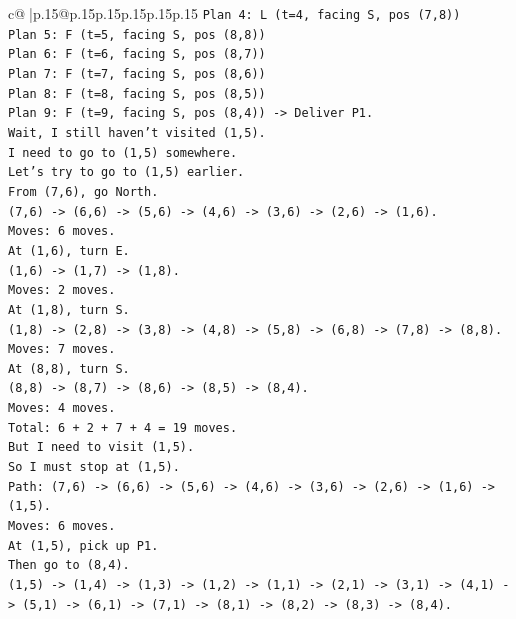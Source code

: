 \documentclass{article}
\begin{document}
{\begin{supertabular}{c@{$\;$}|p{.15\linewidth}@{}p{.15\linewidth}p{.15\linewidth}p{.15\linewidth}p{.15\linewidth}p{.15\linewidth}}
{{{\texttt{Plan 4: L (t=4, facing S, pos (7,8))} \\
\texttt{Plan 5: F (t=5, facing S, pos (8,8))} \\
\texttt{Plan 6: F (t=6, facing S, pos (8,7))} \\
\texttt{Plan 7: F (t=7, facing S, pos (8,6))} \\
\texttt{Plan 8: F (t=8, facing S, pos (8,5))} \\
\texttt{Plan 9: F (t=9, facing S, pos (8,4)) {-}> Deliver P1.} \\
\texttt{Wait, I still haven't visited (1,5).} \\
\texttt{I need to go to (1,5) somewhere.} \\
\texttt{Let's try to go to (1,5) earlier.} \\
\texttt{From (7,6), go North.} \\
\texttt{(7,6) {-}> (6,6) {-}> (5,6) {-}> (4,6) {-}> (3,6) {-}> (2,6) {-}> (1,6).} \\
\texttt{Moves: 6 moves.} \\
\texttt{At (1,6), turn E.} \\
\texttt{(1,6) {-}> (1,7) {-}> (1,8).} \\
\texttt{Moves: 2 moves.} \\
\texttt{At (1,8), turn S.} \\
\texttt{(1,8) {-}> (2,8) {-}> (3,8) {-}> (4,8) {-}> (5,8) {-}> (6,8) {-}> (7,8) {-}> (8,8).} \\
\texttt{Moves: 7 moves.} \\
\texttt{At (8,8), turn S.} \\
\texttt{(8,8) {-}> (8,7) {-}> (8,6) {-}> (8,5) {-}> (8,4).} \\
\texttt{Moves: 4 moves.} \\
\texttt{Total: 6 + 2 + 7 + 4 = 19 moves.} \\
\texttt{But I need to visit (1,5).} \\
\texttt{So I must stop at (1,5).} \\
\texttt{Path: (7,6) {-}> (6,6) {-}> (5,6) {-}> (4,6) {-}> (3,6) {-}> (2,6) {-}> (1,6) {-}> (1,5).} \\
\texttt{Moves: 6 moves.} \\
\texttt{At (1,5), pick up P1.} \\
\texttt{Then go to (8,4).} \\
\texttt{(1,5) {-}> (1,4) {-}> (1,3) {-}> (1,2) {-}> (1,1) {-}> (2,1) {-}> (3,1) {-}> (4,1) {-}> (5,1) {-}> (6,1) {-}> (7,1) {-}> (8,1) {-}> (8,2) {-}> (8,3) {-}> (8,4).} \\
}}}
\end{supertabular}}
\end{document}
